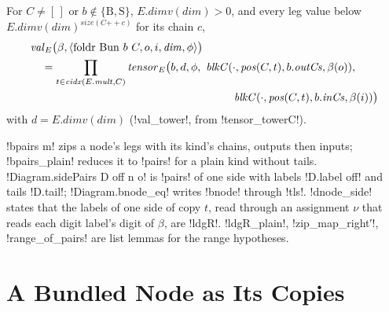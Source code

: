 {\begin{theorem}[Tower]\label{thm:boxes-val-tower}
For $C\ne[\,]$ or $b\notin\{\mathrm B,\mathrm S\}$, $E.\mathit{dimv}(\mathit{dim})>0$, and every leg value below $E.\mathit{dimv}(\mathit{dim})^{\mathit{size}(C\mathbin{+\!\!+}c)}$ for its chain $c$,
\begin{align*}
&\mathit{val}_E\bigl(\beta,\langle\mathrm{foldr\ Bun}\ b\ C,o,i,\mathit{dim},\phi\rangle\bigr)\\
&\quad=\prod_{t\in\mathit{cidx}(E.\mathit{mult},C)}\mathit{tensor}_E\bigl(b,d,\phi,\ \mathit{blkC}(\cdot,\mathit{pos}(C,t),b.\mathit{outCs},\beta(o)),\\
&\hspace{6.5cm}\mathit{blkC}(\cdot,\mathit{pos}(C,t),b.\mathit{inCs},\beta(i))\bigr)
\end{align*}
with $d=E.\mathit{dimv}(\mathit{dim})$ (\lbx!val_tower!, from \lbx!tensor_towerC!).
\end{theorem}
\lbx!bpairs m! zips a node's legs with its kind's chains, outputs then inputs; \lbx!bpairs_plain! reduces it to \lbx!pairs! for a plain kind without tails. \lbx!Diagram.sidePairs D off n o! is \lbx!pairs! of one side with labels \lbx!D.label off! and tails \lbx!D.tail!; \lbx!Diagram.bnode_eq! writes \lbx!bnode! through \lbx!tls!. \lbx!dnode_side! states that the labels of one side of copy $t$, read through an assignment $\nu$ that reads each digit label's digit of $\beta$, are \lbx!ldgR!. \lbx!ldgR_plain!, \lbx!zip_map_right′!, \lbx!range_of_pairs! are list lemmas for the range hypotheses.

\section{A Bundled Node as Its Copies}\label{sec:boxes-nodebridge}

}
